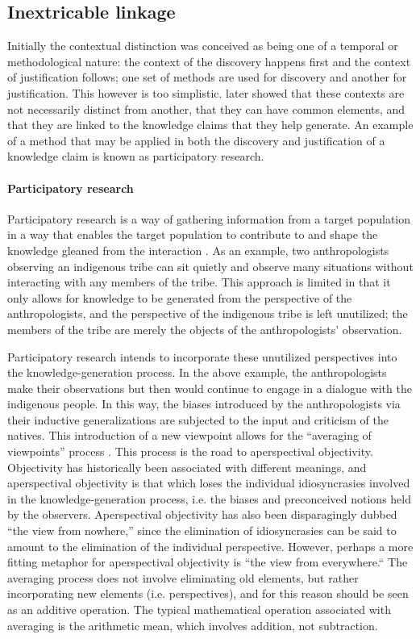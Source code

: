 \documentclass[a4paper]{article}
\begin{document}
\subsection{Inextricable linkage}

Initially the contextual distinction was conceived as being one of a temporal
or methodological nature: the context of the discovery happens first and the
context of justification follows; one set of methods are used for discovery
and another for justification. This however is too simplistic.
\cite{kuhn1970structure} later showed that these contexts are not necessarily
distinct from another, that they can have common elements, and that they are
linked to the knowledge claims that they help generate. An example of a method
that may be applied in both the discovery and justification of a knowledge
claim is known as participatory research.

\paragraph{Participatory research}
\label{part}

Participatory research is a way of gathering information from a target
population in a way that enables the target population to contribute to and
shape the knowledge gleaned from the interaction
\citep{bergold2012participatory}. As an example, two anthropologists observing
an indigenous tribe can sit quietly and observe many situations without
interacting with any members of the tribe. This approach is limited in that it
only allows for knowledge to be generated from the perspective of the
anthropologists, and the perspective of the indigenous tribe is left
unutilized; the members of the tribe are merely the objects of the
anthropologists' observation.

Participatory research intends to incorporate these unutilized perspectives
into the knowledge-generation process. In the above example, the
anthropologists make their observations but then would continue to engage in a
dialogue with the indigenous people. In this way, the biases introduced by the
anthropologists via their inductive generalizations are subjected to the input
and criticism of the natives. This introduction of a new viewpoint allows for
the ``averaging of viewpoints'' process \citep{datson1992objectivity}. This
process is the road to aperspectival objectivity. Objectivity has historically
been associated with different meanings, and aperspectival objectivity is that
which loses the individual idiosyncrasies involved in the knowledge-generation
process, i.e. the biases and preconceived notions held by the observers.
Aperspectival objectivity has also been disparagingly dubbed ``the view from
nowhere,'' since the elimination of idiosyncrasies can be said to amount to
the elimination of the individual perspective. However, perhaps a more fitting
metaphor for aperspectival objectivity is ``the view from everywhere.`` The
averaging process does not involve eliminating old elements, but rather
incorporating new elements (i.e. perspectives), and for this reason should be
seen as an additive operation. The typical mathematical operation associated
with averaging is the arithmetic mean, which involves addition, not
subtraction.
\end{document}
